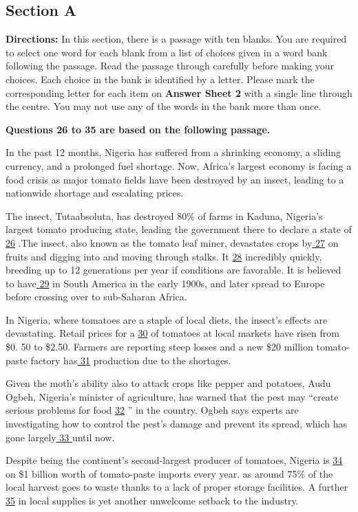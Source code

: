 \documentclass[UTF8,11pt]{ctexart}
\begin{document}
\subsection*{\textbf{Section A}}


\textbf{Directions:} In this section, there is a passage with ten blanks. You are required to select one word for each blank from a list of choices given in a word bank following the passage. Read the passage through carefully before making your choices. Each choice in the bank is identified by a letter. Please mark the corresponding letter for each item on\textbf{ Answer Sheet 2} with a single line through the centre. You may not use any of the words in the bank more than once.


\textbf{Questions 26 to 35 are based on the following passage.}


In the past 12 months, Nigeria has suffered from a shrinking economy, a sliding currency, and a prolonged fuel shortage. Now, Africa’s largest economy is facing a food crisis as major tomato fields have been destroyed by an insect, leading to a nationwide shortage and escalating prices.


The insect, Tutaabsoluta, has destroyed 80\% of farms in Kaduna, Nigeria's largest tomato producing state, leading the government there to declare a state of \uline{26} .The insect, also known as the tomato leaf miner, devastates crops by\uline{ 27} on fruits and digging into and moving through stalks. It \uline{28} incredibly quickly, breeding up to 12 generations per year if conditions are favorable. It is believed to have\uline{ 29} in South America in the early 1900s, and later spread to Europe before crossing over to sub-Saharan Africa.


In Nigeria, where tomatoes are a staple of local diets, the insect's effects are devastating. Retail prices for a \uline{30} of tomatoes at local markets have risen from \$0. 50 to \$2.50. Farmers are reporting steep losses and a new \$20 million tomato-paste factory has\uline{ 31} production due to the shortages.


Given the moth's ability also to attack crops like pepper and potatoes, Audu Ogbeh, Nigeria's minister of agriculture, has warned that the pest may “create serious problems for food \uline{32} ” in the country. Ogbeh says experts are investigating how to control the pest’s damage and prevent its spread, which has gone largely\uline{ 33 }until now.


Despite being the continent's second-largest producer of tomatoes, Nigeria is \uline{34} on \$1 billion worth of tomato-paste imports every year. as around 75\% of the local harvest goes to waste thanks to a lack of proper storage facilities. A further \uline{35} in local supplies is yet another unwelcome setback to the industry.
\end{document}
